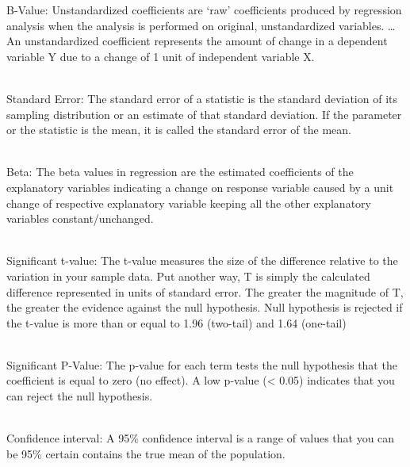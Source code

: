\documentclass[
  letterpaper,
  DIV=11,
  numbers=noendperiod]{scrreprt}
\begin{document}
\begin{tcolorbox}
{B-Value:} {Unstandardized coefficients are `raw' coefficients produced
by regression analysis when the analysis is performed on original,
unstandardized variables. \ldots{} An unstandardized coefficient
represents the amount of change in a dependent variable Y due to a
change of 1 unit of independent variable X.}\\
\strut \\
{Standard Error:} The standard error of a statistic is the standard
deviation of its sampling distribution or an estimate of that standard
deviation. If the parameter or the statistic is the mean, it is called
the standard error of the mean.\\
\strut \\
{Beta:} {The beta values in regression are the estimated coefficients of
the explanatory variables indicating a change on response variable
caused by a unit change of respective explanatory variable keeping all
the other explanatory variables constant/unchanged.}\\
\strut \\
{Significant t-value:} {The t-value measures the size of the difference
relative to the variation in your sample data. Put another way, T is
simply the calculated difference represented in units of standard error.
The greater the magnitude of T, the greater the evidence against the
null hypothesis.} {Null hypothesis is rejected if the t-value is more
than or equal to 1.96 (two-tail) and 1.64 (one-tail)}\\
\strut \\
{Significant P-Value:} {The p-value for each term tests the null
hypothesis that the coefficient is equal to zero (no effect).} {A low
p-value (\textless{} 0.05) indicates that you can reject the null
hypothesis.}\\
\strut \\
{Confidence interval:} {A 95\% confidence interval is a range of values
that you can be 95\% certain contains the true mean of the
population.}\\

\end{tcolorbox}
\end{document}
